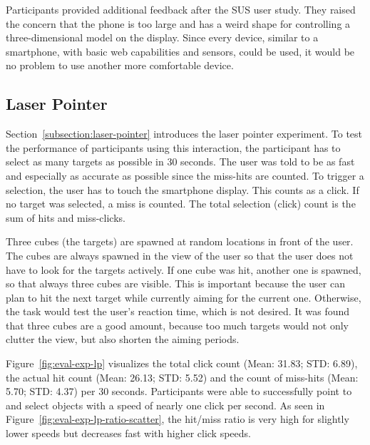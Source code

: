 Participants provided additional feedback after the \gls{SUS} user study. They raised the concern that the phone is too large and has a weird shape for controlling a three-dimensional model on the display. Since every device, similar to a smartphone, with basic web capabilities and sensors, could be used, it would be no problem to use another more comfortable device. 


\subsection{Laser Pointer}\label{section:eval-res-lp}

Section~\ref{subsection:laser-pointer} introduces the laser pointer experiment. To test the performance of participants using this interaction, the participant has to select as many targets as possible in 30 seconds. The user was told to be as fast and especially as accurate as possible since the miss-hits are counted. To trigger a selection, the user has to touch the smartphone display. This counts as a click. If no target was selected, a miss is counted. The total selection (click) count is the sum of hits and miss-clicks.

Three cubes (the targets) are spawned at random locations in front of the user. The cubes are always spawned in the view of the user so that the user does not have to look for the targets actively. 
If one cube was hit, another one is spawned, so that always three cubes are visible. This is important because the user can plan to hit the next target while currently aiming for the current one. Otherwise, the task would test the user's reaction time, which is not desired. It was found that three cubes are a good amount, because too much targets would not only clutter the view, but also shorten the aiming periods.

Figure~\ref{fig:eval-exp-lp} visualizes the total click count (Mean: 31.83; \gls{STD}: 6.89), the actual hit count (Mean: 26.13; \gls{STD}: 5.52) and the count of miss-hits (Mean: 5.70; \gls{STD}: 4.37) per 30 seconds. Participants were able to successfully point to and select objects with a speed of nearly one click per second. As seen in Figure~\ref{fig:eval-exp-lp-ratio-scatter}, the hit/miss ratio is very high for slightly lower speeds but decreases fast with higher click speeds.

